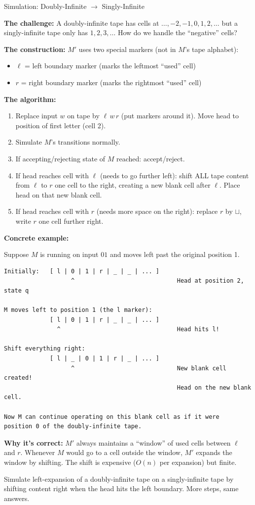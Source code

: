 \documentclass[11pt,a4paper]{article}
\newcommand{\kt}[1]{\par\vspace{0.3em}\colorbox{yellow!60}{\parbox{\dimexpr\linewidth-2\fboxsep}{#1}}\vspace{0.3em}}
\begin{document}
\begin{examplebox}{{Simulation: Doubly-Infinite $\to$ Singly-Infinite}}

\textbf{The challenge:} A doubly-infinite tape has cells at $\ldots, -2, -1, 0, 1, 2, \ldots$ but a singly-infinite tape only has $1, 2, 3, \ldots$ How do we handle the ``negative'' cells?

\textbf{The construction:} $M'$ uses two special markers (not in $M$'s tape alphabet):
\begin{itemize}[nosep]
\item $\ell$ = left boundary marker (marks the leftmost ``used'' cell)
\item $r$ = right boundary marker (marks the rightmost ``used'' cell)
\end{itemize}

\textbf{The algorithm:}
\begin{enumerate}[nosep]
\item Replace input $w$ on tape by $\ell\, w\, r$ (put markers around it). Move head to position of first letter (cell 2).
\item Simulate $M$'s transitions normally.
\item If accepting/rejecting state of $M$ reached: accept/reject.
\item If head reaches cell with $\ell$ (needs to go further left): shift ALL tape content from $\ell$ to $r$ one cell to the right, creating a new blank cell after $\ell$. Place head on that new blank cell.
\item If head reaches cell with $r$ (needs more space on the right): replace $r$ by $\sqcup$, write $r$ one cell further right.
\end{enumerate}

\textbf{Concrete example:}

Suppose $M$ is running on input $01$ and moves left past the original position 1.
\begin{lstlisting}
Initially:   [ l | 0 | 1 | r | _ | _ | ... ]
                   ^                             Head at position 2, state q

M moves left to position 1 (the l marker):
             [ l | 0 | 1 | r | _ | _ | ... ]
               ^                                 Head hits l!

Shift everything right:
             [ l | _ | 0 | 1 | r | _ | ... ]
                   ^                             New blank cell created!
                                                 Head on the new blank cell.

Now M can continue operating on this blank cell as if it were
position 0 of the doubly-infinite tape.
\end{lstlisting}

\textbf{Why it's correct:} $M'$ always maintains a ``window'' of used cells between $\ell$ and $r$. Whenever $M$ would go to a cell outside the window, $M'$ expands the window by shifting. The shift is expensive ($O(n)$ per expansion) but finite.

\kt{Simulate left-expansion of a doubly-infinite tape on a singly-infinite tape by shifting content right when the head hits the left boundary. More steps, same answers.}
\end{examplebox}
\end{document}
